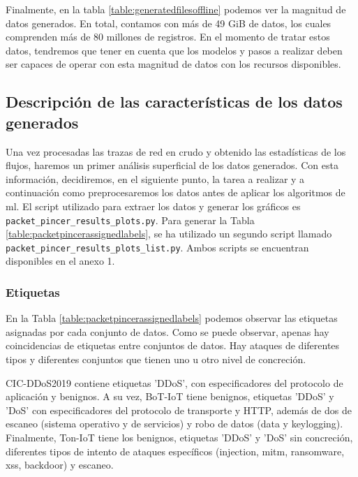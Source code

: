 Finalmente, en la tabla \ref{table:generatedfilesoffline} podemos ver la magnitud de datos generados. En total, contamos con más de 49 GiB de datos, los cuales comprenden más de 80 millones de registros. En el momento de tratar estos datos, tendremos que tener en cuenta que los modelos y pasos a realizar deben ser capaces de operar con esta magnitud de datos con los recursos disponibles.

\subsection{Descripción de las características de los datos generados}

Una vez procesadas las trazas de red en crudo y obtenido las estadísticas de los flujos, haremos un primer análisis superficial de los datos generados. Con esta información, decidiremos, en el siguiente punto, la tarea a realizar y a continuación como preprocesaremos los datos antes de aplicar los algoritmos de \gls{ml}. El script utilizado para extraer los datos y generar los gráficos es \texttt{packet\_pincer\_results\_plots.py}. Para generar la Tabla \ref{table:packetpincerassignedlabels}, se ha utilizado un segundo script llamado \texttt{packet\_pincer\_results\_plots\_list.py}. Ambos scripts se encuentran disponibles en el anexo 1.

\subsubsection{Etiquetas}

En la Tabla \ref{table:packetpincerassignedlabels} podemos observar las etiquetas asignadas por cada conjunto de datos. Como se puede observar, apenas hay coincidencias de etiquetas entre conjuntos de datos. Hay ataques de diferentes tipos y diferentes conjuntos que tienen uno u otro nivel de concreción.



CIC-DDoS2019 contiene etiquetas 'DDoS', con especificadores del protocolo de aplicación y benignos. A su vez, BoT-IoT tiene benignos, etiquetas 'DDoS' y 'DoS' con especificadores del protocolo de transporte y HTTP, además de dos de escaneo (sistema operativo y de servicios) y robo de datos (data y keylogging). Finalmente, Ton-IoT tiene los benignos, etiquetas 'DDoS' y 'DoS' sin concreción, diferentes tipos de intento de ataques específicos (injection, mitm, ransomware, xss, backdoor) y escaneo.

